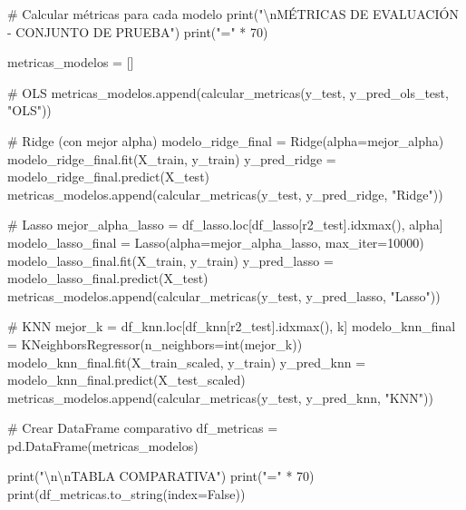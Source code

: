 \documentclass[
  doc,
  floatsintext,
  longtable,
  a4paper,
  nolmodern,
  notxfonts,
  notimes,
  12pt,
  colorlinks=true,linkcolor=blue,citecolor=blue,urlcolor=blue]{apa7}
\newenvironment{Shaded}{\begin{snugshade}}{\end{snugshade}}
\newcommand{\BuiltInTok}[1]{\textcolor[rgb]{0.00,0.23,0.31}{#1}}
\newcommand{\CharTok}[1]{\textcolor[rgb]{0.13,0.47,0.30}{#1}}
\newcommand{\CommentTok}[1]{\textcolor[rgb]{0.37,0.37,0.37}{#1}}
\newcommand{\DecValTok}[1]{\textcolor[rgb]{0.68,0.00,0.00}{#1}}
\newcommand{\NormalTok}[1]{\textcolor[rgb]{0.00,0.23,0.31}{#1}}
\newcommand{\OperatorTok}[1]{\textcolor[rgb]{0.37,0.37,0.37}{#1}}
\newcommand{\StringTok}[1]{\textcolor[rgb]{0.13,0.47,0.30}{#1}}
\newcommand{\VariableTok}[1]{\textcolor[rgb]{0.07,0.07,0.07}{#1}}
\begin{document}
\begin{Shaded}
\begin{Highlighting}[]
\CommentTok{\# Calcular métricas para cada modelo}
\BuiltInTok{print}\NormalTok{(}\StringTok{"}\CharTok{\textbackslash{}n}\StringTok{MÉTRICAS DE EVALUACIÓN {-} CONJUNTO DE PRUEBA"}\NormalTok{)}
\BuiltInTok{print}\NormalTok{(}\StringTok{"="} \OperatorTok{*} \DecValTok{70}\NormalTok{)}

\NormalTok{metricas\_modelos }\OperatorTok{=}\NormalTok{ []}

\CommentTok{\# OLS}
\NormalTok{metricas\_modelos.append(calcular\_metricas(y\_test, y\_pred\_ols\_test, }\StringTok{"OLS"}\NormalTok{))}

\CommentTok{\# Ridge (con mejor alpha)}
\NormalTok{modelo\_ridge\_final }\OperatorTok{=}\NormalTok{ Ridge(alpha}\OperatorTok{=}\NormalTok{mejor\_alpha)}
\NormalTok{modelo\_ridge\_final.fit(X\_train, y\_train)}
\NormalTok{y\_pred\_ridge }\OperatorTok{=}\NormalTok{ modelo\_ridge\_final.predict(X\_test)}
\NormalTok{metricas\_modelos.append(calcular\_metricas(y\_test, y\_pred\_ridge, }\StringTok{"Ridge"}\NormalTok{))}

\CommentTok{\# Lasso}
\NormalTok{mejor\_alpha\_lasso }\OperatorTok{=}\NormalTok{ df\_lasso.loc[df\_lasso[}\StringTok{\textquotesingle{}r2\_test\textquotesingle{}}\NormalTok{].idxmax(), }\StringTok{\textquotesingle{}alpha\textquotesingle{}}\NormalTok{]}
\NormalTok{modelo\_lasso\_final }\OperatorTok{=}\NormalTok{ Lasso(alpha}\OperatorTok{=}\NormalTok{mejor\_alpha\_lasso, max\_iter}\OperatorTok{=}\DecValTok{10000}\NormalTok{)}
\NormalTok{modelo\_lasso\_final.fit(X\_train, y\_train)}
\NormalTok{y\_pred\_lasso }\OperatorTok{=}\NormalTok{ modelo\_lasso\_final.predict(X\_test)}
\NormalTok{metricas\_modelos.append(calcular\_metricas(y\_test, y\_pred\_lasso, }\StringTok{"Lasso"}\NormalTok{))}

\CommentTok{\# KNN}
\NormalTok{mejor\_k }\OperatorTok{=}\NormalTok{ df\_knn.loc[df\_knn[}\StringTok{\textquotesingle{}r2\_test\textquotesingle{}}\NormalTok{].idxmax(), }\StringTok{\textquotesingle{}k\textquotesingle{}}\NormalTok{]}
\NormalTok{modelo\_knn\_final }\OperatorTok{=}\NormalTok{ KNeighborsRegressor(n\_neighbors}\OperatorTok{=}\BuiltInTok{int}\NormalTok{(mejor\_k))}
\NormalTok{modelo\_knn\_final.fit(X\_train\_scaled, y\_train)}
\NormalTok{y\_pred\_knn }\OperatorTok{=}\NormalTok{ modelo\_knn\_final.predict(X\_test\_scaled)}
\NormalTok{metricas\_modelos.append(calcular\_metricas(y\_test, y\_pred\_knn, }\StringTok{"KNN"}\NormalTok{))}

\CommentTok{\# Crear DataFrame comparativo}
\NormalTok{df\_metricas }\OperatorTok{=}\NormalTok{ pd.DataFrame(metricas\_modelos)}

\BuiltInTok{print}\NormalTok{(}\StringTok{"}\CharTok{\textbackslash{}n\textbackslash{}n}\StringTok{TABLA COMPARATIVA"}\NormalTok{)}
\BuiltInTok{print}\NormalTok{(}\StringTok{"="} \OperatorTok{*} \DecValTok{70}\NormalTok{)}
\BuiltInTok{print}\NormalTok{(df\_metricas.to\_string(index}\OperatorTok{=}\VariableTok{False}\NormalTok{))}
\end{Highlighting}
\end{Shaded}
\end{document}
